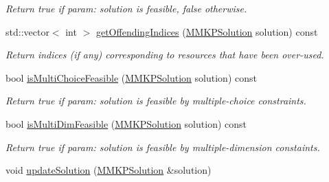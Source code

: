 \begin{DoxyCompactItemize}
\begin{DoxyCompactList}\small\item\em Return true if param\+: solution is feasible, false otherwise. \end{DoxyCompactList}\item 
\hypertarget{class_m_m_k_p_data_set_af6ac07291b0670eb54c3a41392c2eac0}{std\+::vector$<$ int $>$ \hyperlink{class_m_m_k_p_data_set_af6ac07291b0670eb54c3a41392c2eac0}{get\+Offending\+Indices} (\hyperlink{class_m_m_k_p_solution}{M\+M\+K\+P\+Solution} solution) const }\label{class_m_m_k_p_data_set_af6ac07291b0670eb54c3a41392c2eac0}

\begin{DoxyCompactList}\small\item\em Return indices (if any) corresponding to resources that have been over-\/used. \end{DoxyCompactList}\item 
\hypertarget{class_m_m_k_p_data_set_a5d5d901598b6a30e4eec83eb43e2195e}{bool \hyperlink{class_m_m_k_p_data_set_a5d5d901598b6a30e4eec83eb43e2195e}{is\+Multi\+Choice\+Feasible} (\hyperlink{class_m_m_k_p_solution}{M\+M\+K\+P\+Solution} solution) const }\label{class_m_m_k_p_data_set_a5d5d901598b6a30e4eec83eb43e2195e}

\begin{DoxyCompactList}\small\item\em Return true if param\+: solution is feasible by multiple-\/choice constraints. \end{DoxyCompactList}\item 
\hypertarget{class_m_m_k_p_data_set_a229df06b830b95fa8f028ec565911f96}{bool \hyperlink{class_m_m_k_p_data_set_a229df06b830b95fa8f028ec565911f96}{is\+Multi\+Dim\+Feasible} (\hyperlink{class_m_m_k_p_solution}{M\+M\+K\+P\+Solution} solution) const }\label{class_m_m_k_p_data_set_a229df06b830b95fa8f028ec565911f96}

\begin{DoxyCompactList}\small\item\em Return true if param\+: solution is feasible by multiple-\/dimension constaints. \end{DoxyCompactList}\item 
\hypertarget{class_m_m_k_p_data_set_a389bd00ef2f3c1feb014a0e8ca128222}{void \hyperlink{class_m_m_k_p_data_set_a389bd00ef2f3c1feb014a0e8ca128222}{update\+Solution} (\hyperlink{class_m_m_k_p_solution}{M\+M\+K\+P\+Solution} \&solution)}\label{class_m_m_k_p_data_set_a389bd00ef2f3c1feb014a0e8ca128222}


\end{DoxyCompactItemize}
